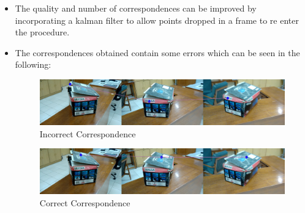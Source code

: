\documentclass{article}
\begin{document}
\begin{itemize}
\begin{center}
\begin{tabular}{|c | c|}
					\end{tabular}
					\end{center}
				\item The quality and number of correspondences can be improved by incorporating a kalman filter to allow points dropped in a frame to re enter the procedure.
				\item The correspondences obtained contain some errors which can be seen in the following:
				    \begin{figure}[ht!]
			      \centering
          				\includegraphics[width=1.0\linewidth]{00018.jpg}
          				\caption{Incorrect Correspondence}
    \end{figure}
    \begin{figure}
          \centering
          \includegraphics[width=1.0\linewidth]{00027.jpg}
          \caption{Correct Correspondence}
    \end{figure}
			\end{itemize}

	\newpage
\end{document}
